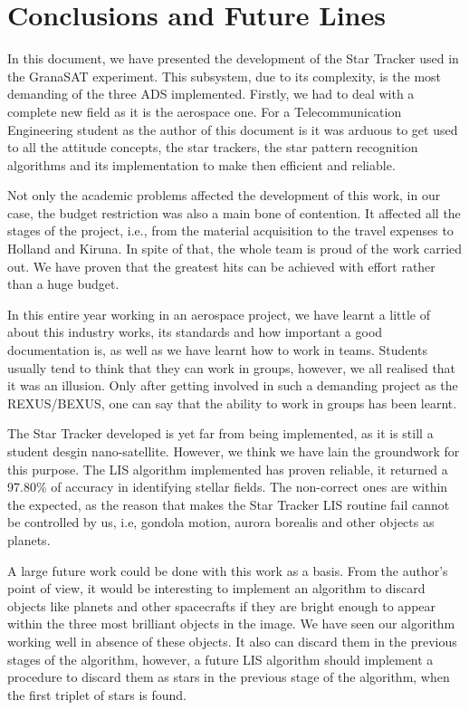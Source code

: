\chapter{Conclusions and Future Lines}\label{chap:chapter6}

In this document, we have presented the development of the Star Tracker used in the GranaSAT experiment. This subsystem, due to its complexity, is the most demanding of the three \gls{ADS} implemented. Firstly, we had to deal with a complete new field as it is the aerospace one. For a Telecommunication Engineering student as the author of this document is it was arduous to get used to all the attitude concepts, the star trackers, the star pattern recognition algorithms and its implementation to make then efficient and reliable.  

Not only the academic problems affected the development of this work, in our case, the budget restriction was also a main bone of contention. It affected all the stages of the project, i.e., from the material acquisition to the travel expenses to Holland and Kiruna. In spite of that, the whole team is proud of the work carried out. We have proven that the greatest hits can be achieved with effort rather than a huge budget. 

In this entire year working in an aerospace project, we have learnt a little of about this industry works, its standards and how important a good documentation is, as well as we have learnt how to work in teams. Students usually tend to think that they can work in groups, however, we all realised that it was an illusion. Only after getting involved in such a demanding project as the REXUS/BEXUS, one can say that the ability to work in groups has been learnt.

The Star Tracker developed is yet far from being implemented, as it is still a student desgin nano-satellite. However, we think we have lain the groundwork for this purpose. The \gls{LIS} algorithm implemented has proven reliable, it returned a 97.80\% of accuracy in identifying stellar fields. The non-correct ones are within the expected, as the reason that makes the Star Tracker \gls{LIS} routine fail cannot be controlled by us, i.e, gondola motion, aurora borealis and other objects as planets.

A large future work could be done with this work as a basis. From the author's point of view, it would be interesting to implement an algorithm to discard objects like planets and other spacecrafts if they are bright enough to appear within the three most brilliant objects in the image. We have seen our algorithm working well in absence of these objects. It also can discard them in the previous stages of the algorithm, however, a future \gls{LIS} algorithm should implement a procedure to discard them as stars in the previous stage of the algorithm, when the first triplet of stars is found.

